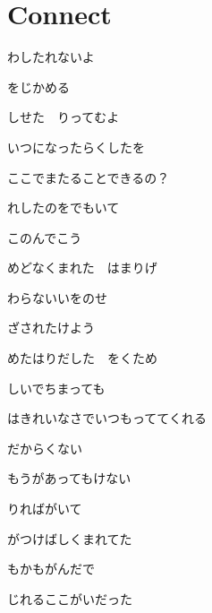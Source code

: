 \section{Connect}

わしたれないよ

をじかめる

しせた　りってむよ

\bigskip

いつになったらくしたを

ここでまたることできるの？

\bigskip

れしたのをでもいて

このんでこう

\bigskip

めどなくまれた　はまりげ

わらないいをのせ

ざされたけよう

\bigskip

めたはりだした　をくため

しいでちまっても

はきれいなさでいつもっててくれる

だからくない

もうがあってもけない

\bigskip

りればがいて

がつけばしくまれてた

\bigskip

もかもがんだで

じれるここがいだった


